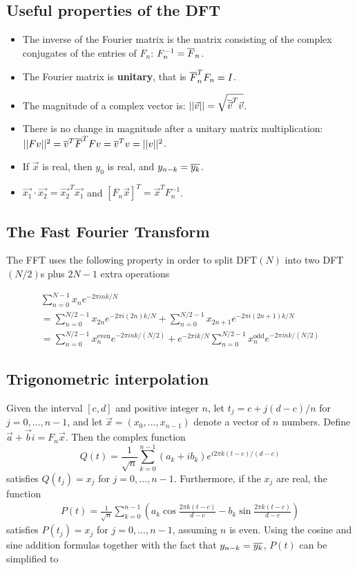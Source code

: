 \subsection{Useful properties of the DFT}
\begin{itemize}
    \item The inverse of the Fourier matrix is the matrix consisting of the complex conjugates of the entries of $F_n$: $F_n^{-1} = \overline{F}_n$.
    \item The Fourier matrix is \textbf{unitary}, that is $\overline{F}_n^T F_n = I$.
    \item The magnitude of a complex vector is: $||\vec{v}|| = \sqrt{\overline{\vec{v}}^T \vec{v}}$.
    \item There is no change in magnitude after a unitary matrix multiplication: $||Fv||^2 = \overline{v}^T\overline{F}^T F v = \overline{v}^T v = ||v||^2$.
    \item If $\vec{x}$ is real, then $y_0$ is real, and $y_{n-k} = \overline{y_k}$.
    \item $\vec{x_1} \cdot \vec{x_2} = \vec{x_2}^T \vec{x_1}$ and $[F_n \vec{x}]^T = \vec{x}^TF_n^{-1}$.
\end{itemize}

\subsection{The Fast Fourier Transform}
The FFT uses the following property in order to split DFT$(N)$ into two DFT$(N/2)$s plus $2N-1$ extra operations

\begin{gather*}
 \sum_{n=0}^{N-1}x_n e^{-2 \pi i n k / N} \\
= \sum_{n=0}^{N/2-1} x_{2n}e^{-2 \pi i(2n)k/N} + \sum_{n=0}^{N/2-1} x_{2n+1}e^{-2 \pi i(2n+1)k/N} \\
= \sum_{n=0}^{N/2-1} x_n^{\text{even}}e^{-2 \pi i n k /(N/2)} + e^{-2 \pi i k / N} \sum_{n=0}^{N/2-1} x_n^{\text{odd}}e^{-2 \pi i n k /(N/2)}
\end{gather*}

\subsection{Trigonometric interpolation}
Given the interval $[c,d]$ and positive integer $n$, let $t_j = c + j(d-c)/n$ for $j = 0,...,n-1$, and let $\vec{x}=(x_0,...,x_{n-1})$ denote a vector of $n$ numbers. Define $\vec{a} + \vec{b}i = F_n \vec{x}$. Then the complex function
$$
Q(t) = \frac{1}{\sqrt{n}} \sum_{k=0}^{n-1} (a_k + i b_k) e^{i 2\pi k (t-c)/(d-c)}
$$
satisfies $Q(t_j) = x_j$ for $j= 0,...,n-1$. Furthermore, if the $x_j$ are real, the function
\begin{gather*}
P(t) = \frac{1}{\sqrt{n}} \sum_{k=0}^{n-1} \left( a_k \cos{\frac{2 \pi k (t-c)}{d-c}} - b_k \sin{\frac{2 \pi k (t-c)}{d-c}} \right)
\end{gather*}
satisfies $P(t_j) = x_j$ for $j = 0, ... ,n-1$, assuming $n$ is even. Using the cosine and sine addition formulas together with the fact that $y_{n-k} = \overline{y_k}$, $P(t)$ can be simplified to

